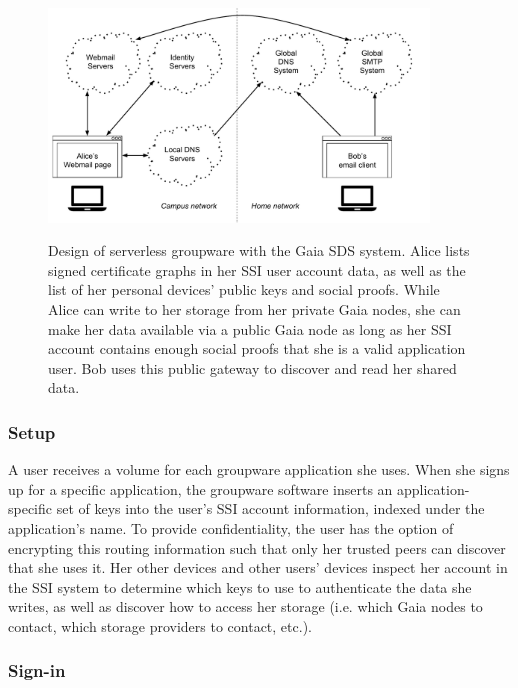 \begin{figure}[h]
   \caption{Design of serverless groupware with the Gaia SDS system.  Alice
   lists signed certificate graphs in her SSI user account data, as well as the
   list of her personal devices' public keys and social proofs.  While Alice can
   write to her storage from her private Gaia nodes, she can make her data
   available via a public Gaia node as long as her SSI account contains enough
   social proofs that she is a valid application user.  Bob
   uses this public gateway to discover and read her shared data.}
   \centering
   \includegraphics[width=0.9\textwidth,page=23]{figures/dissertation-figures}
   \label{fig:chap4-gaia-groupware}
\end{figure}

\subsubsection{Setup}

A user receives a volume for each groupware application she uses.  When she signs up for a specific
application, the groupware software inserts an application-specific set of keys
into the user's SSI account information, indexed under the application's name.  To provide
confidentiality, the user has the option of encrypting this routing information
such that only her trusted peers can discover that she uses it.  Her other
devices and other users' devices inspect her account in the SSI system to determine
which keys to use to authenticate the data she writes, as well as discover how
to access her storage (i.e. which Gaia nodes to contact, which storage providers
to contact, etc.).

\subsubsection{Sign-in}

